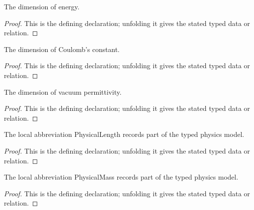 \begin{definition}[energyDimension]
  \label{decl:physics:IPhO_2026_1_B_1:energyDimension}
  The dimension of energy.
\end{definition}
\begin{proof}
  This is the defining declaration; unfolding it gives the stated typed data or relation.
\end{proof}

\begin{definition}[coulombConstantDimension]
  \label{decl:physics:IPhO_2026_1_B_1:coulombConstantDimension}
  The dimension of Coulomb's constant.
\end{definition}
\begin{proof}
  This is the defining declaration; unfolding it gives the stated typed data or relation.
\end{proof}

\begin{definition}[permittivityDimension]
  \label{decl:physics:IPhO_2026_1_B_1:permittivityDimension}
  The dimension of vacuum permittivity.
\end{definition}
\begin{proof}
  This is the defining declaration; unfolding it gives the stated typed data or relation.
\end{proof}

\begin{definition}[PhysicalLength]
  \label{decl:physics:IPhO_2026_1_B_1:PhysicalLength}
  The local abbreviation PhysicalLength records part of the typed physics model.
\end{definition}
\begin{proof}
  This is the defining declaration; unfolding it gives the stated typed data or relation.
\end{proof}

\begin{definition}[PhysicalMass]
  \label{decl:physics:IPhO_2026_1_B_1:PhysicalMass}
  The local abbreviation PhysicalMass records part of the typed physics model.
\end{definition}
\begin{proof}
  This is the defining declaration; unfolding it gives the stated typed data or relation.
\end{proof}

